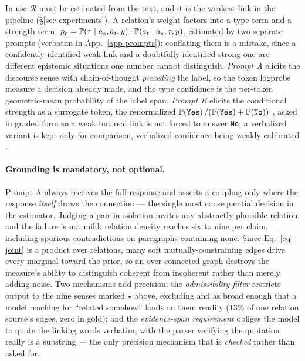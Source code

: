 In use $\mathcal{R}$ must be estimated from the text, and it is the weakest link in the pipeline
(\S\ref{sec-experiments}). A relation's weight factors into a type term and a strength term,
$p_r = \mathbb{P}\!\left( \tau \mid a_s,a_t,y \right)\cdot\mathbb{P}\!\left( a_t \mid a_s,\tau,y \right)$, estimated by two separate prompts (verbatim in
App.~\ref{app-prompts}); conflating them is a mistake, since a confidently-identified weak link and a
doubtfully-identified strong one are different epistemic situations one number cannot distinguish. \emph{Prompt
A} elicits the discourse sense with chain-of-thought \emph{preceding} the label, so the token logprobs measure a
decision already made, and the type confidence is the per-token geometric-mean probability of the label span.
\emph{Prompt B} elicits the conditional strength as a surrogate token, the renormalized
$\mathbb{P}\!\left( \texttt{Yes} \right)/(\mathbb{P}\!\left( \texttt{Yes} \right)+\mathbb{P}\!\left( \texttt{No} \right))$ \citep{kadavath}, asked in graded form so a weak but
real link is not forced to answer \texttt{No}; a verbalized variant is kept only for comparison, verbalized
confidence being weakly calibrated \citep{xiong}.

\paragraph{Grounding is mandatory, not optional.} Prompt A always receives the full response and asserts a
coupling only where the response \emph{itself} draws the connection --- the single most consequential decision
in the estimator. Judging a pair in isolation invites any abstractly plausible relation, and the failure
is not mild: relation density reaches six to nine per claim, including spurious contradictions on paragraphs
containing none. Since Eq.~\ref{eq-joint} is a product over relations, many soft
mutually-constraining edges drive every marginal toward the prior, so an over-connected graph destroys the
measure's ability to distinguish coherent from incoherent rather than merely adding noise. Two mechanisms add
precision: the \emph{admissibility filter} restricts output to the nine senses marked $\star$ above, excluding
 and  as broad enough that a model reaching for ``related somehow'' lands
on them readily ($13\%$ of one relation source's edges, zero in gold); and the \emph{evidence-span requirement} obliges the
model to quote the linking words verbatim, with the parser verifying the quotation really is a substring --- the
only precision mechanism that is \emph{checked} rather than asked for.

